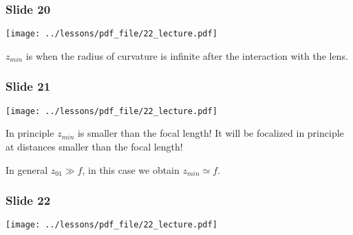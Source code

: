 \documentclass[../main/main.tex]{subfiles}
\begin{document}
\subsubsection*{Slide 20}

\begin{minipage}[]{0.5\linewidth}
\centering
\texttt{[image: ../lessons/pdf\_file/22\_lecture.pdf]}
\end{minipage}
\hspace{0.3cm}\vspace{0.3cm}
\begin{minipage}[c]{0.47\linewidth}

\( z_{min} \) is when the radius of curvature is infinite after the interaction with the lens.

\end{minipage}

\subsubsection*{Slide 21}

\begin{minipage}[]{0.5\linewidth}
\centering
\texttt{[image: ../lessons/pdf\_file/22\_lecture.pdf]}
\end{minipage}
\hspace{0.3cm}\vspace{0.3cm}
\begin{minipage}[c]{0.47\linewidth}

In principle \( z_{min} \) is smaller than the focal length!
It will be focalized in principle at distances smaller than the focal length!

In general \( z_{01} \gg f \), in this case we obtain \( z_{min} \simeq  f \).

\end{minipage}

\subsubsection*{Slide 22}

\begin{minipage}[]{0.5\linewidth}
\centering
\texttt{[image: ../lessons/pdf\_file/22\_lecture.pdf]}
\end{minipage}
\hspace{0.3cm}\vspace{0.3cm}
\begin{minipage}[c]{0.47\linewidth}

\end{minipage}
\end{document}
